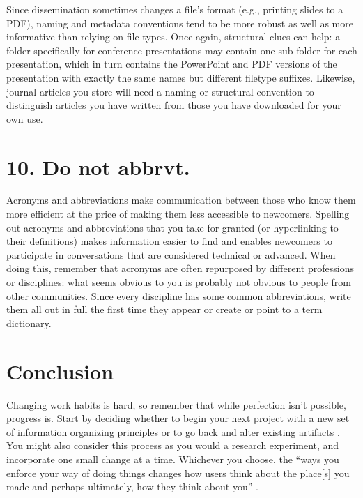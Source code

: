 \documentclass[10pt,letterpaper]{article}
\newcommand{\rulemajor}[1]{\section*{#1}}
\begin{document}
Since dissemination sometimes changes a file's format (e.g., printing slides to
a PDF), naming and metadata conventions tend to be more robust as well as more
informative than relying on file types. Once again, structural clues can help:
a folder specifically for conference presentations may contain one sub-folder
for each presentation, which in turn contains the PowerPoint and PDF versions of
the presentation with exactly the same names but different filetype suffixes.
Likewise, journal articles you store will need a naming or structural convention
to distinguish articles you have written from those you have downloaded for your
own use.

\rulemajor{10. Do not abbrvt.}

Acronyms and abbreviations make communication between those who know them more
efficient at the price of making them less accessible to newcomers. Spelling
out acronyms and abbreviations that you take for granted (or hyperlinking to
their definitions) makes information easier to find and enables newcomers to
participate in conversations that are considered technical or advanced. When
doing this, remember that acronyms are often repurposed by different professions
or disciplines: what seems obvious to you is probably not obvious to people from
other communities. Since every discipline has some common abbreviations, write
them all out in full the first time they appear or create or point to a term
dictionary.

\section*{Conclusion}

Changing work habits is hard, so remember that while perfection isn't possible,
progress is. Start by deciding whether to begin your next project with a new
set of information organizing principles or to go back and alter existing
artifacts \cite{Briney2015}. You might also consider this process as you would
a research experiment, and incorporate one small change at a time. Whichever
you choose, the ``ways you enforce your way of doing things changes how users
think about the place[s] you made and perhaps ultimately, how they think about
you'' \cite{Covert2014}.


\end{document}
